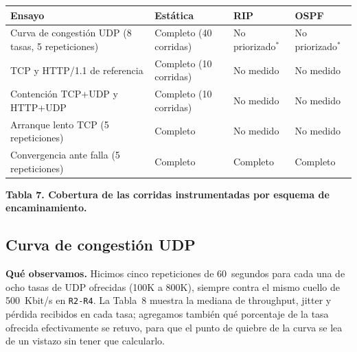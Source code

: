 \documentclass[11pt,a4paper]{article}
\newcommand{\figcaption}[1]{\par\noindent\footnotesize\textbf{#1}\par\vspace{0.4cm}}
\begin{document}
\needspace{1cm}
\begin{center}
\begin{minipage}{0.96\linewidth}
\centering
\scriptsize
\renewcommand{\arraystretch}{1.15}
\setlength{\tabcolsep}{3pt}
\begin{tabular}{@{}p{4.1cm}p{3.5cm}p{3.5cm}p{3.1cm}@{}}
\toprule
\textbf{Ensayo} & \textbf{Est\'atica} & \textbf{RIP} & \textbf{OSPF} \\
\midrule
Curva de congesti\'on UDP (8 tasas, 5 repeticiones) & Completo (40 corridas) & No priorizado$^{*}$ & No priorizado$^{*}$ \\
TCP y HTTP/1.1 de referencia & Completo (10 corridas) & No medido & No medido \\
Contenci\'on TCP+UDP y HTTP+UDP & Completo (10 corridas) & No medido & No medido \\
Arranque lento TCP (5 repeticiones) & Completo & No medido & No medido \\
Convergencia ante falla (5 repeticiones) & Completo & Completo & Completo \\
\bottomrule
\end{tabular}
\par\vspace{0.1cm}
\figcaption{Tabla 7. Cobertura de las corridas instrumentadas por esquema de encaminamiento.}
\end{minipage}
\end{center}

\subsection*{Curva de congesti\'on UDP}

\textbf{Qu\'e observamos.} Hicimos cinco repeticiones de 60~segundos para cada una de ocho tasas de UDP ofrecidas (100K a 800K), siempre contra el mismo cuello de 500~Kbit/s en \texttt{R2-R4}. La Tabla~8 muestra la mediana de throughput, jitter y p\'erdida recibidos en cada tasa; agregamos tambi\'en qu\'e porcentaje de la tasa ofrecida efectivamente se retuvo, para que el punto de quiebre de la curva se lea de un vistazo sin tener que calcularlo.
\end{document}
